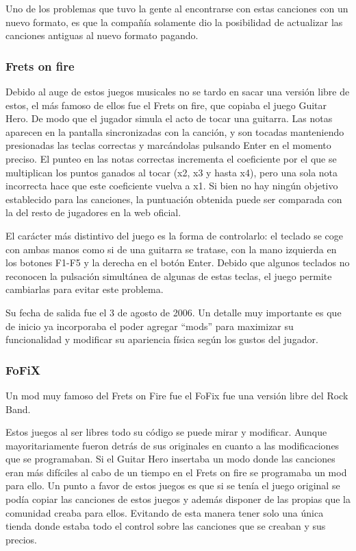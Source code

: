 \documentclass[a4paper,11pt,oneside]{book}
\begin{document}
Uno de los problemas que tuvo la gente al encontrarse con estas canciones con un nuevo formato, es que la compañía solamente dio la posibilidad de actualizar las canciones antiguas al nuevo formato pagando.


\subsubsection{Frets on fire}
Debido al auge de estos juegos musicales no se tardo en sacar una versión libre de estos, el más famoso de ellos fue el Frets on fire, que copiaba el juego \gls{Guitar Hero}.
De modo que el jugador simula el acto de tocar una guitarra. Las notas aparecen en la pantalla sincronizadas con la canción, y son tocadas manteniendo presionadas las teclas correctas y marcándolas pulsando Enter en el momento preciso. El punteo en las notas correctas incrementa el coeficiente por el que se multiplican los puntos ganados al tocar (x2, x3 y hasta x4), pero una sola nota incorrecta hace que este coeficiente vuelva a x1. Si bien no hay ningún objetivo establecido para las canciones, la puntuación obtenida puede ser comparada con la del resto de jugadores en la web oficial.

El carácter más distintivo del juego es la forma de controlarlo: el teclado se coge con ambas manos como si de una guitarra se tratase, con la mano izquierda en los botones F1-F5 y la derecha en el botón Enter. Debido que algunos teclados no reconocen la pulsación simultánea de algunas de estas teclas, el juego permite cambiarlas para evitar este problema.

Su fecha de salida fue el 3 de agosto de 2006. Un detalle muy importante es que de inicio ya incorporaba el poder agregar ``mods'' para maximizar su funcionalidad y modificar su apariencia física según los gustos del jugador.

\subsubsection{FoFiX}
Un mod muy famoso del Frets on Fire fue el FoFix fue una versión libre del \gls{Rock Band}.

Estos juegos al ser libres todo su código se puede mirar y modificar. Aunque mayoritariamente fueron detrás de sus originales en cuanto a las modificaciones que se programaban. Si el \gls{Guitar Hero} insertaba un modo donde las canciones eran más difíciles al cabo de un tiempo en el Frets on fire se programaba un mod para ello. 
Un punto a favor de estos juegos es que si se tenía el juego original se podía copiar las canciones de estos juegos y además disponer de las propias que la comunidad creaba para ellos. Evitando de esta manera tener solo una única tienda donde estaba todo el control sobre las canciones que se creaban y sus precios.
\end{document}
